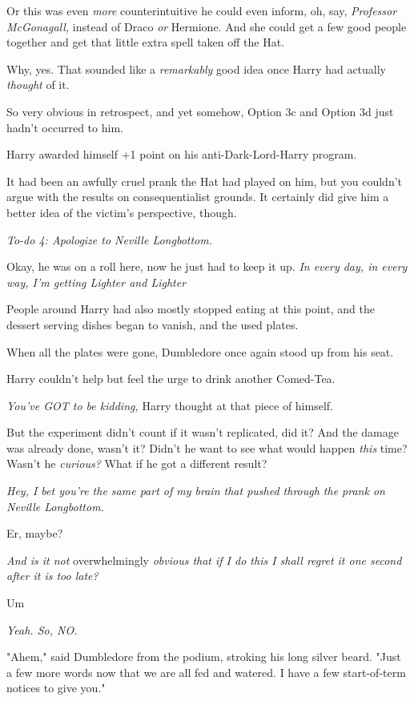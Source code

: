 Or{\el} this was even \emph{more} counterintuitive{\el} he could even
inform, oh, say, \emph{Professor McGonagall,} instead of Draco \emph{or}
Hermione. And she could get a few good people together and get that little
extra spell taken off the Hat.

Why, yes. That sounded like a \emph{remarkably} good idea once Harry had
actually \emph{thought} of it.

So very obvious in retrospect, and yet somehow, Option 3c and Option 3d just
hadn't occurred to him.

Harry awarded himself +1 point on his anti-Dark-Lord-Harry program.

It had been an awfully cruel prank the Hat had played on him, but you couldn't
argue with the results on consequentialist grounds. It certainly did give him a
better idea of the victim's perspective, though.

\emph{To-do 4: Apologize to Neville Longbottom.}

Okay, he was on a roll here, now he just had to keep it up. \emph{In every day,
in every way, I'm getting Lighter and Lighter{\el}}

People around Harry had also mostly stopped eating at this point, and the
dessert serving dishes began to vanish, and the used plates.

When all the plates were gone, Dumbledore once again stood up from his seat.

Harry couldn't help but feel the urge to drink another Comed-Tea.

\emph{You've GOT to be kidding,} Harry thought at that piece of himself.

But the experiment didn't count if it wasn't replicated, did it? And the damage
was already done, wasn't it? Didn't he want to see what would happen
\emph{this} time? Wasn't he \emph{curious?} What if he got a different result?

\emph{Hey, I bet you're the same part of my brain that pushed through the prank
on Neville Longbottom.}

Er, maybe?

\emph{And is it not} overwhelmingly \emph{obvious that if I do this I shall
regret it one second after it is too late?}

Um{\el}

\emph{Yeah. So, NO.}

"Ahem," said Dumbledore from the podium, stroking his long silver beard. "Just
a few more words now that we are all fed and watered. I have a few
start-of-term notices to give you."


